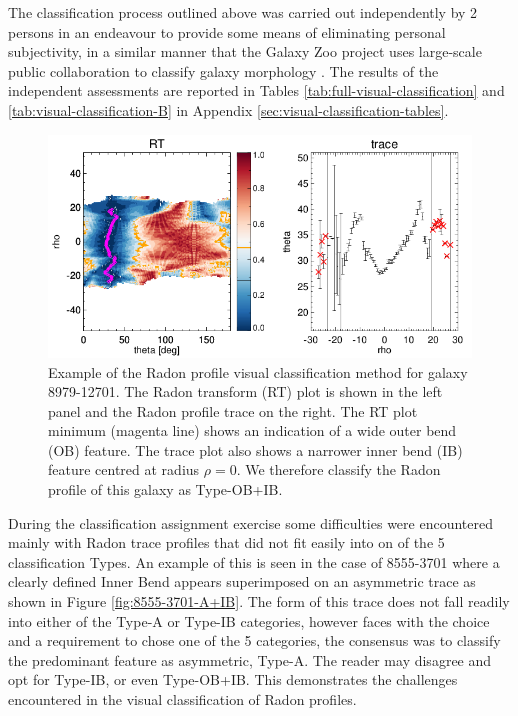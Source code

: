 The classification process outlined above was carried out independently by 2 persons in an endeavour to provide some means of eliminating personal subjectivity, in a similar manner that the Galaxy Zoo project uses large-scale public collaboration to classify galaxy morphology \citep{2017MNRAS.464.4176W}. The results of the  independent assessments are reported in Tables \ref{tab:full-visual-classification} and \ref{tab:visual-classification-B} in Appendix \ref{sec:visual-classification-tables}.

\begin{figure}
    \centering
    \includegraphics[width=\columnwidth]{images/RadonPlots/RT-SNIPS-NEW/8979-12701-VA-OB+IB.png}
    \caption[Example of the Radon profile visual classification of galaxy 8979-12701]{Example of the Radon profile visual classification method for galaxy 8979-12701. The Radon transform (RT) plot is shown in the left panel and the Radon profile trace on the right. The RT plot minimum (magenta line) shows an indication of a wide outer bend (OB) feature. The trace plot also shows a narrower inner bend (IB) feature centred at radius $\rho=0$. We therefore classify the Radon profile of this galaxy as Type-OB+IB.}
    \label{fig:OB+IB}
\end{figure}

During the classification assignment exercise  some difficulties were encountered mainly with Radon trace profiles that did not fit easily into on of the 5 classification Types. An example of this is seen in the case of 8555-3701 where a clearly defined Inner Bend appears superimposed on an asymmetric trace as shown in Figure \ref{fig:8555-3701-A+IB}. The form of this trace does not fall readily into either of the Type-A or Type-IB categories, however faces with the choice and a requirement to chose one of the 5 categories, the consensus was to classify the predominant feature as asymmetric, Type-A. The reader may disagree and opt for Type-IB, or even Type-OB+IB. This demonstrates the challenges encountered in the visual classification of Radon profiles.

